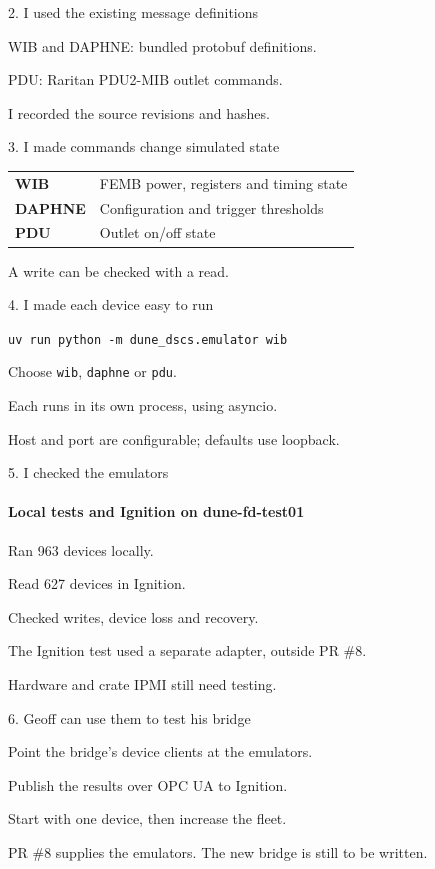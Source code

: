 \documentclass[aspectratio=169,11pt]{beamer}
\begin{document}
\begin{frame}{2. I used the existing message definitions}
  \vfill
  {\Large
    WIB and DAPHNE: bundled protobuf definitions.\par\bigskip
    PDU: Raritan PDU2-MIB outlet commands.\par\bigskip
    I recorded the source revisions and hashes.\par}
  \vfill
\end{frame}

\begin{frame}{3. I made commands change simulated state}
  \vfill
  {\large
  \renewcommand{\arraystretch}{1.7}
  \begin{tabular}{@{}p{}p{}@{}}
    \textbf{WIB} & FEMB power, registers and timing state \\
    \textbf{DAPHNE} & Configuration and trigger thresholds \\
    \textbf{PDU} & Outlet on/off state
  \end{tabular}\par}
  \bigskip\bigskip
  {\Large A write can be checked with a read.\par}
  \vfill
\end{frame}

\begin{frame}{4. I made each device easy to run}
  \vfill
  {\normalsize\texttt{uv run python -m dune\_dscs.emulator wib}\par}
  \bigskip\bigskip
  {\Large
    Choose \texttt{wib}, \texttt{daphne} or \texttt{pdu}.\par\bigskip
    Each runs in its own process, using asyncio.\par}
  \vfill
  {\small Host and port are configurable; defaults use loopback.\par}
\end{frame}

\begin{frame}{5. I checked the emulators}
  \framesubtitle{Local tests and Ignition on dune-fd-test01}
  \vfill
  {\Large
    Ran 963 devices locally.\par\bigskip
    Read 627 devices in Ignition.\par\bigskip
    Checked writes, device loss and recovery.\par}
  \vfill
  {\small The Ignition test used a separate adapter, outside PR \#8.\par
    Hardware and crate IPMI still need testing.\par}
\end{frame}

\begin{frame}{6. Geoff can use them to test his bridge}
  \vfill
  {\Large
    Point the bridge's device clients at the emulators.\par\bigskip
    Publish the results over OPC UA to Ignition.\par\bigskip
    Start with one device, then increase the fleet.\par}
  \vfill
  {\small PR \#8 supplies the emulators. The new bridge is still to be written.\par}
\end{frame}
\end{document}
